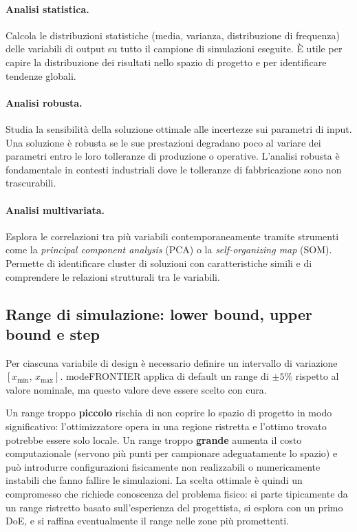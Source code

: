 \paragraph{Analisi statistica.}
Calcola le distribuzioni statistiche (media, varianza, distribuzione
di frequenza) delle variabili di output su tutto il campione di
simulazioni eseguite.
È utile per capire la distribuzione dei risultati nello spazio di
progetto e per identificare tendenze globali.

\paragraph{Analisi robusta.}
Studia la sensibilità della soluzione ottimale alle incertezze sui
parametri di input.
Una soluzione è robusta se le sue prestazioni degradano poco al
variare dei parametri entro le loro tolleranze di produzione o
operative.
L'analisi robusta è fondamentale in contesti industriali dove le
tolleranze di fabbricazione sono non trascurabili.

\paragraph{Analisi multivariata.}
Esplora le correlazioni tra più variabili contemporaneamente tramite
strumenti come la \textit{principal component analysis} (PCA) o la
\textit{self-organizing map} (SOM).
Permette di identificare cluster di soluzioni con caratteristiche simili
e di comprendere le relazioni strutturali tra le variabili.

\subsection{Range di simulazione: lower bound, upper bound e step}
\label{sec:ranges}

Per ciascuna variabile di design è necessario definire un intervallo
di variazione $[x_{\min},\, x_{\max}]$.
modeFRONTIER applica di default un range di $\pm 5\%$ rispetto al
valore nominale, ma questo valore deve essere scelto con cura.

Un range troppo \textbf{piccolo} rischia di non coprire lo spazio di
progetto in modo significativo: l'ottimizzatore opera in una regione
ristretta e l'ottimo trovato potrebbe essere solo locale.
Un range troppo \textbf{grande} aumenta il costo computazionale (servono
più punti per campionare adeguatamente lo spazio) e può introdurre
configurazioni fisicamente non realizzabili o numericamente instabili
che fanno fallire le simulazioni.
La scelta ottimale è quindi un compromesso che richiede conoscenza del
problema fisico: si parte tipicamente da un range ristretto basato
sull'esperienza del progettista, si esplora con un primo DoE, e si
raffina eventualmente il range nelle zone più promettenti.


